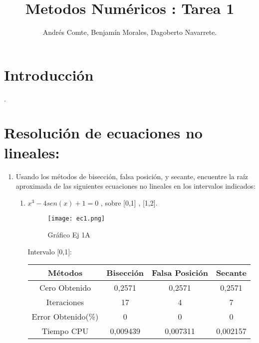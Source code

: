 \documentclass{udpreport}
\title{Metodos Numéricos : Tarea 1}
\author{Andrés Comte, Benjamín Morales, Dagoberto Navarrete.}
\begin{document}
\maketitle
\tableofcontents
\listoffigures

\chapter{Introducción}

.
\chapter{Resolución de ecuaciones no lineales:}
\begin{enumerate}
\item Usando los métodos de bisección, falsa posición, y secante, encuentre la raíz aproximada 
de las siguientes ecuaciones no lineales en los intervalos indicados:

    \begin{enumerate}
        
    Para realizar estas ecuaciones se utilizaron los programas de :
    \begin{itemize}
        \item Biseccion.m
        \item Secante.m
        \item Falsa.m
    \end{itemize}
    y las comparaciones de error se hicieron en base a el resultado de la función fzero de matlab
    
    \item  \(x^3 - 4sen(x) +1 = 0\) , sobre [0,1] , [1,2].
        \begin{figure}[H]
            \centering
            \texttt{[image: ec1.png]}
             \caption{Gráfico Ej 1A}
        \end{figure}
        
            \begin{table}[H]Intervalo [0,1]:
            \centering
                \begin{tabular} { |c|c|c|c|}
                \hline
                Métodos       & Bisección & Falsa Posición & Secante  \\
                \hline
                Cero Obtenido &  0,2571       &    0,2571      &      0,2571    \\
                \hline
                Iteraciones   &    17        &     4     &       7        \\
                \hline
                Error Obtenido(\%) &       0      &       0      &     0         \\
                \hline
                Tiempo CPU &       0,009439     &      0,007311     &     0,002157         \\
                 \hline
                \end{tabular}
            \end{table}
            

\end{enumerate}
\end{enumerate}
\end{document}
